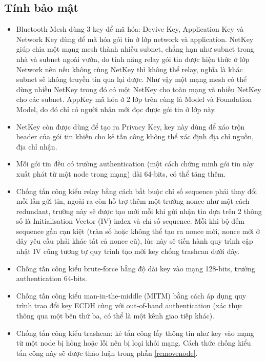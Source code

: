         \subsection{Tính bảo mật}
            \begin{itemize}
                \item Bluetooth Mesh dùng 3 key để mã hóa: Devive Key, Application Key và Network Key dùng để mã hóa gói tin ở lớp network và application. NetKey giúp chia một mạng mesh thành nhiều subnet, chẳng hạn như subnet trong nhà và subnet ngoài vườn, do tính năng relay gói tin được hiện thức ở lớp Network nên nếu không cùng NetKey thì không thể relay, nghĩa là khác subnet sẽ không truyền tin qua lại được. Như vậy một mạng mesh có thể dùng nhiều NetKey trong đó có một NetKey cho toàn mạng và nhiều NetKey cho các subnet. AppKey mã hóa ở 2 lớp trên cùng là Model và Foundation Model, do đó chỉ có người nhận mới đọc được gói tin ở lớp này.
                \item NetKey còn được dùng để tạo ra Privacy Key, key này dùng để xáo trộn header của gói tin khiến cho kẻ tấn công không thể xác định địa chỉ nguồn, địa chỉ nhận.
                \item Mỗi gói tin đều có trường authentication (một cách chứng minh gói tin này xuất phát từ một node trong mạng) dài 64-bits, có thể tăng thêm.
                \item Chống tấn công kiểu relay bằng cách bắt buộc chỉ số sequence phải thay đổi mỗi lần gửi tin, ngoài ra còn hỗ trợ thêm một trường nonce như một cách redundant, trường này sẽ được tạo mới mỗi khi gửi nhận tin dựa trên 2 thông số là Initialisation Vector (IV) index và chỉ số sequence. Mỗi khi bộ đếm sequence gần cạn kiệt (tràn số hoặc không thể tạo ra nonce mới, nonce mới ở đây yêu cầu phải khác tất cả nonce cũ), lúc này sẽ tiến hành quy trình cập nhật IV cũng tương tự quy trình tạo mới key chống trashcan dưới đây.
                \item Chống tấn công kiểu brute-force bằng độ dài key vào mạng 128-bits, trường authentication 64-bits.
                \item Chống tấn công kiểu man-in-the-middle (MITM) bằng cách áp dụng quy trình trao đổi key ECDH\cite{ECDH} cùng với out-of-band authentication (xác thực thông qua một bên thứ ba, có thể là một kênh giao tiếp khác).
                \item Chống tấn công kiểu trashcan: kẻ tấn công lấy thông tin như key vào mạng từ một node bị hỏng hoặc lỗi nên bị loại khỏi mạng. Cách thức chống kiểu tấn công này sẽ được thảo luận trong phần \ref{removenode}.

\end{itemize}
